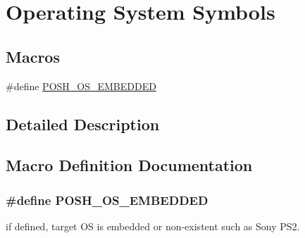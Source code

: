 \hypertarget{group__OSSymbols}{}\section{Operating System Symbols}
\label{group__OSSymbols}
\subsection*{Macros}
\begin{DoxyCompactItemize}
\item 
\#define \hyperlink{group__OSSymbols_ga60c596449ab81cea386504ea09d26596}{P\+O\+S\+H\+\_\+\+O\+S\+\_\+\+E\+M\+B\+E\+D\+D\+ED}
\end{DoxyCompactItemize}


\subsection{Detailed Description}


\subsection{Macro Definition Documentation}
\subsubsection[{\texorpdfstring{P\+O\+S\+H\+\_\+\+O\+S\+\_\+\+E\+M\+B\+E\+D\+D\+ED}{POSH_OS_EMBEDDED}}]{\setlength{\rightskip}{0pt plus 5cm}\#define P\+O\+S\+H\+\_\+\+O\+S\+\_\+\+E\+M\+B\+E\+D\+D\+ED}\hypertarget{group__OSSymbols_ga60c596449ab81cea386504ea09d26596}{}\label{group__OSSymbols_ga60c596449ab81cea386504ea09d26596}
if defined, target OS is embedded or non-\/existent such as Sony P\+S2. 